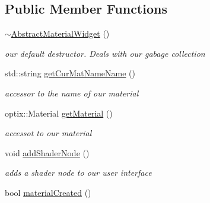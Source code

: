 \subsection*{Public Member Functions}
\begin{DoxyCompactItemize}
\item 
\hypertarget{class_abstract_material_widget_af5dcc2f282ee2b607c7cfb132fd96b12}{\hyperlink{class_abstract_material_widget_af5dcc2f282ee2b607c7cfb132fd96b12}{$\sim$\-Abstract\-Material\-Widget} ()}\label{class_abstract_material_widget_af5dcc2f282ee2b607c7cfb132fd96b12}

\begin{DoxyCompactList}\small\item\em our default destructor. Deals with our gabage collection \end{DoxyCompactList}\item 
\hypertarget{class_abstract_material_widget_a3e25d0095c98840a1705fcb34a78441b}{std\-::string \hyperlink{class_abstract_material_widget_a3e25d0095c98840a1705fcb34a78441b}{get\-Cur\-Mat\-Name\-Name} ()}\label{class_abstract_material_widget_a3e25d0095c98840a1705fcb34a78441b}

\begin{DoxyCompactList}\small\item\em accessor to the name of our material \end{DoxyCompactList}\item 
\hypertarget{class_abstract_material_widget_a85987f671b7e4c284f6d7d39d834d800}{optix\-::\-Material \hyperlink{class_abstract_material_widget_a85987f671b7e4c284f6d7d39d834d800}{get\-Material} ()}\label{class_abstract_material_widget_a85987f671b7e4c284f6d7d39d834d800}

\begin{DoxyCompactList}\small\item\em accessot to our material \end{DoxyCompactList}\item 
\hypertarget{class_abstract_material_widget_a24133fd1d3a66d898ca30a69b8f9cff3}{void \hyperlink{class_abstract_material_widget_a24133fd1d3a66d898ca30a69b8f9cff3}{add\-Shader\-Node} ()}\label{class_abstract_material_widget_a24133fd1d3a66d898ca30a69b8f9cff3}

\begin{DoxyCompactList}\small\item\em adds a shader node to our user interface \end{DoxyCompactList}\item 
\hypertarget{class_abstract_material_widget_ac7b5ac03177e6f3779b055c2ae872308}{bool \hyperlink{class_abstract_material_widget_ac7b5ac03177e6f3779b055c2ae872308}{material\-Created} ()}\label{class_abstract_material_widget_ac7b5ac03177e6f3779b055c2ae872308}


\end{DoxyCompactItemize}
